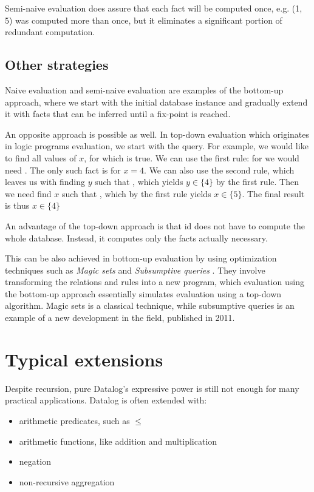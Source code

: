 Semi-naive evaluation does assure that each fact will be computed once, e.g. (1, 5) was computed more than once, but it eliminates a significant portion of redundant computation.

\subsection{Other strategies}
Naive evaluation and semi-naive evaluation are examples of the bottom-up approach, where we start with the initial database instance and gradually extend it with facts that can be inferred until a fix-point is reached.

An opposite approach is possible as well. In top-down evaluation which originates in logic programs evaluation, we start with the query. For example, we would like to find all values of $x$, for which  is true. We can use the first rule: for  we would need . The only such fact is  for $x=4$. We can also use the second rule, which leaves us with finding $y$ such that , which yields $y \in \{4\}$ by the first rule. Then we need find $x$ such that , which by the first rule yields $x \in \{5\}$. The final result is thus $x \in \{4\}$

An advantage of the top-down approach is that id does not have to compute the whole database. Instead, it computes only the facts actually necessary.

This can be also achieved in bottom-up evaluation by using optimization techniques such as \emph{Magic sets} \cite{magicsets, fod} and \emph{Subsumptive queries} \cite{subsumptivequeries}. They involve transforming the relations and rules into a new program, which evaluation using the bottom-up approach essentially simulates evaluation using a top-down algorithm. Magic sets is a classical technique, while subsumptive queries is an example of a new development in the field, published in 2011.

\section{Typical extensions}
Despite recursion, pure Datalog's expressive power is still not enough for many practical applications. Datalog is often extended with:
\begin{itemize}
\item arithmetic predicates, such as $\le$
\item arithmetic functions, like addition and multiplication
\item negation
\item non-recursive aggregation
\end{itemize}

